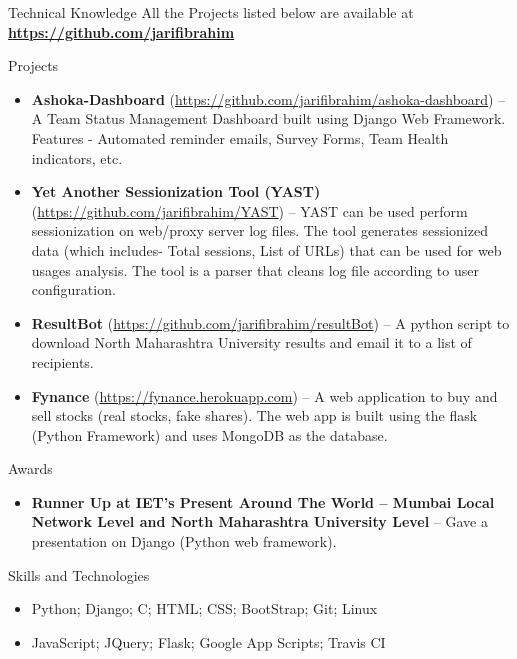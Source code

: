\documentclass[]{mcdowellcv}
\begin{document}
	\begin{cvsection}{Technical Knowledge}{}{}
	All the Projects listed below are available at     \textbf{\url{https://github.com/jarifibrahim}}   \\     \begin{cvsubsection}{Projects}{}{}
			\begin{itemize}
			    
			    \item \textbf{Ashoka-Dashboard} (\url{https://github.com/jarifibrahim/ashoka-dashboard}) -- A Team Status Management Dashboard built using Django Web Framework. Features - Automated reminder emails, Survey Forms, Team Health indicators, etc.
			    
				\item \textbf{Yet Another Sessionization Tool (YAST)}
				(\url{https://github.com/jarifibrahim/YAST}) -- YAST can be used perform sessionization on web/proxy server log files. The tool generates sessionized data (which includes- Total sessions, List of URLs) that can be used for web usages analysis. The tool is a parser that cleans log file according to user configuration.
				
	    		\item \textbf{ResultBot}                (\url{https://github.com/jarifibrahim/resultBot}) -- A python script to download North Maharashtra University results and email it to a list of recipients. 
			    
			    \item \textbf{Fynance} (\url{https://fynance.herokuapp.com})
			        -- A web application to buy and sell stocks (real stocks, fake shares). The web app is built using the flask (Python Framework) and uses MongoDB as the database.
			\end{itemize}
		\end{cvsubsection}
	\end{cvsection}
	
	\begin{cvsection}{Awards}
		\begin{cvsubsection}{}{}{}	
			\begin{itemize}
				\item \textbf{Runner Up at IET's Present Around The World -- Mumbai Local Network Level and North Maharashtra University Level} -- Gave a presentation on Django (Python web framework).
			\end{itemize}
		\end{cvsubsection}
	\end{cvsection}
	
	\begin{cvsection}{Skills and Technologies}
		\begin{cvsubsection}{}{}{}	
			\begin{itemize}
				\item Python; Django; C; HTML; CSS; BootStrap; Git; Linux
				\item  JavaScript; JQuery; Flask; Google App Scripts; Travis CI
			\end{itemize}
		\end{cvsubsection}
	\end{cvsection}
	
\end{document}
